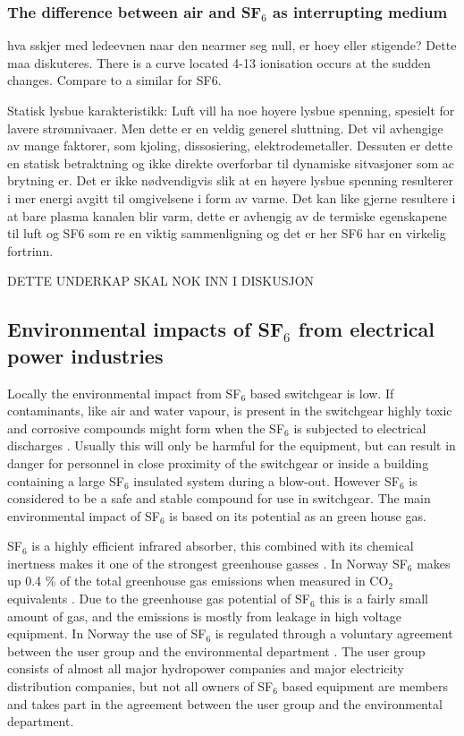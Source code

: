 \documentclass[10pt,a4paper]{article} %
\begin{document}


\subsubsection{The difference between air and SF$_6$ as interrupting medium} \label{sec:airandsf}
hva sskjer med ledeevnen naar den nearmer seg null, er hoey eller stigende? Dette maa diskuteres.
There is a curve located 4-13 ionisation occurs at the sudden changes. Compare to a similar for SF6.

Statisk lysbue karakteristikk: Luft vill ha noe hoyere lysbue spenning, spesielt for lavere strømnivaaer. Men dette er en veldig generel sluttning. Det vil avhengige av mange faktorer, som kjoling, dissosiering, elektrodemetaller. Dessuten er dette en statisk betraktning og ikke direkte overforbar til dynamiske sitvasjoner som ac brytning er. Det er ikke nødvendigvis slik at en høyere lysbue spenning resulterer i mer energi avgitt til omgivelsene i form av varme. Det kan like gjerne resultere i at bare plasma kanalen blir varm, dette er avhengig av de termiske egenskapene til luft og SF6 som re en viktig sammenligning og det er her SF6 har en virkelig fortrinn.

DETTE UNDERKAP SKAL NOK INN I DISKUSJON

\newpage
\subsection{Environmental impacts of SF$_6$ from electrical power industries} \label{sec:EnvirImp}
Locally the environmental impact from SF$_6$ based switchgear is low. If contaminants, like air and water vapour, is present in the switchgear highly toxic and corrosive compounds might form when the SF$_6$ is subjected to electrical discharges \cite{bib:SF6PI}. Usually this will only be harmful for the equipment, but can result in danger for personnel in close proximity of the switchgear or inside a building containing a large SF$_6$ insulated system during a blow-out. However SF$_6$ is considered to be a safe and stable compound for use in switchgear. The main environmental impact of SF$_6$ is based on its potential as an green house gas.

SF$_6$ is a highly efficient infrared absorber, this combined with its chemical inertness makes it one of the strongest greenhouse gasses \cite{bib:SF6PI}. In Norway SF$_6$ makes up 0.4 \% of the total greenhouse gas emissions when measured in CO$_2$ equivalents \cite{bib:KlimaKur2020}. Due to the greenhouse gas potential of SF$_6$ this is a fairly small amount of gas, and the emissions is mostly from leakage in high voltage equipment. In Norway the use of SF$_6$ is regulated through a voluntary agreement between the user group
and the environmental department \cite{bib:KlimaKur2020}. The user group consists of almost all major hydropower companies and major electricity distribution companies, but not all owners of SF$_6$ based equipment are members and takes part in the agreement between the user group and the environmental department.
\end{document}
